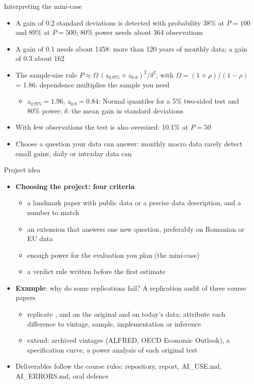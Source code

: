 \begin{frame}{Interpreting the mini-case}
\itemsize{\small}
\begin{itemize}
    \item A gain of 0.2 standard deviations is detected with probability 38\% at $P = 100$ and 89\% at $P = 500$; 80\% power needs about 364 observations
    \item A gain of 0.1 needs about 1458: more than 120 years of monthly data; a gain of 0.3 about 162
    \item The sample-size rule $P \approx \Omega\,(z_{0.975} + z_{0.8})^2/\delta^2$, with $\Omega = (1 + \rho)/(1 - \rho)$ = 1.86: dependence multiplies the sample you need
    \begin{itemize}
        \item $z_{0.975} = 1.96$, $z_{0.8} = 0.84$: Normal quantiles for a 5\% two-sided test and 80\% power; $\delta$: the mean gain in standard deviations
    \end{itemize}
    \item With few observations the test is also oversized: 10.1\% at $P = 50$
    \item Choose a question your data can answer: monthly macro data rarely detect small gains, daily or intraday data can
\end{itemize}
\end{frame}

\begin{frame}{Project idea}
\itemsize{\small}
\begin{itemize}
    \item \textbf{Choosing the project: four criteria}
    \begin{itemize}
        \item a landmark paper with public data or a precise data description, and a number to match
        \item an extension that answers one new question, preferably on Romanian or EU data
        \item enough power for the evaluation you plan (the mini-case)
        \item a verdict rule written before the first estimate
    \end{itemize}
    \item \textbf{Example}: why do some replications fail? A replication audit of three course papers
    \begin{itemize}
        \item replicate ,  and  on the original and on today's data; attribute each difference to vintage, sample, implementation or inference
        \item extend: archived vintages (ALFRED, OECD Economic Outlook), a specification curve, a power analysis of each original test
    \end{itemize}
    \item Deliverables follow the course rules: repository, report, AI\_USE.md, AI\_ERRORS.md, oral defence
\end{itemize}
\end{frame}


